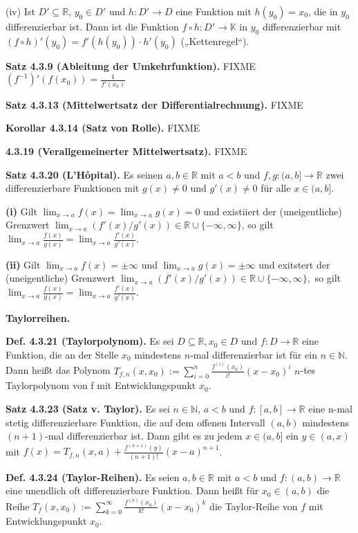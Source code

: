 (iv) Ist $D' \subseteq \mathbb R$, $y_0 \in D'$ und $h:D' \rightarrow D$ eine Funktion mit $h(y_0) = x_0$, die in $y_0$ differenzierbar ist. Dann ist die Funktion $f \circ h : D' \rightarrow \mathbb K$ in $y_0$ differenzierbar mit $(f \circ h)'(y_0) = f'(h(y_0)) \cdot h'(y_0)$ („Kettenregel“).

\textbf{Satz 4.3.9 (Ableitung der Umkehrfunktion).} FIXME $(f^{-1})' (f(x_0)) = \frac{1}{f'(x_0)}$

\textbf{Satz 4.3.13 (Mittelwertsatz der Differentialrechnung).} FIXME 

\textbf{Korollar 4.3.14 (Satz von Rolle).} FIXME

\textbf{4.3.19 (Verallgemeinerter Mittelwertsatz).} FIXME

\textbf{Satz 4.3.20 (L'Hôpital).} Es seinen $a,b\in\mathbb{R}$ mit
$a<b$ und $f,g:(a,b]\rightarrow\mathbb{R}$ zwei differenzierbare
Funktionen mit $g(x)\not=0$ und $g'(x)\not=0$ für alle $x\in(a,b]$.

\textbf{(i)} Gilt $\lim_{x\rightarrow a}f(x)=\lim_{x\rightarrow a}g(x)=0$
und existiiert der (uneigentliche) Grenzwert $\lim_{x\rightarrow a}(f'(x)/g'(x))\in\mathbb{R}\cup\{-\infty,\infty\}$,
so gilt $\lim_{x\rightarrow a}\frac{f(x)}{g(x)}=\lim_{x\rightarrow a}\frac{f'(x)}{g'(x)}$.

\textbf{(ii)} Gilt $\lim_{x\rightarrow a}f(x)=\pm\infty$ und $\lim_{x\rightarrow a}g(x)=\pm\infty$
und exitstert der (uneigentliche) Grenzwert $\lim_{x\rightarrow a}(f'(x)/g'(x))\in\mathbb{R}\cup\{-\infty,\infty\},$
so gilt $\lim_{x\rightarrow a}\frac{f(x)}{g(x)}=\lim_{x\rightarrow a}\frac{f'(x)}{g'(x)}$.

\textbf{Taylorreihen.}

\textbf{Def. 4.3.21 (Taylorpolynom).} Es sei $D\subseteq\mathbb{R},x_{0}\in D$
und $f:D\rightarrow\mathbb{R}$ eine Funktion, die an der Stelle $x_{0}$
mindestens $n$-mal differenzierbar ist für ein $n\in\mathbb{N}.$
Dann heißt das Polynom $T_{f,n}(x,x_{0}):=\sum_{i=0}^{n}\frac{f^{(i)}(x_{0})}{i!}(x-x_{0})^{i}$
$n$-tes Taylorpolynom von f mit Entwicklungspunkt $x_{0}$.

\textbf{Satz 4.3.23 (Satz v. Taylor).} Es sei $n\in\mathbb{N}$, $a<b$
und $f:[a,b]\rightarrow\mathbb{R}$ eine n-mal stetig differenzierbare
Funktion, die auf dem offenen Intervall $(a,b)$ mindestens $(n+1)$-mal
differenzierbar ist. Dann gibt es zu jedem $x\in(a,b]$ ein $y\in(a,x)$
mit $f(x)=T_{f,n}(x,a)+\frac{f^{(n+1)}(y)}{(n+1)!}(x-a)^{n+1}$.


\textbf{Def. 4.3.24 (Taylor-Reihen).} Es seien $a,b\in\mathbb{R}$
mit $a<b$ und $f:(a,b)\rightarrow\mathbb{R}$ eine unendlich oft
differenzierbare Funktion. Dann heißt für $x_{0}\in(a,b)$ die Reihe
$T_{f}(x,x_{0}):=\sum_{k=0}^{\infty}\frac{f^{(k)}(x_{0})}{k!}(x-x_{0})^{k}$
die Taylor-Reihe von $f$ mit Entwicklungspunkt $x_{0}$.

